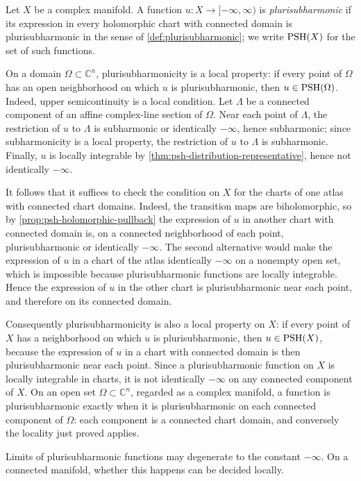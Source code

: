 Let $X$ be a complex manifold. A function $u\colon X\to[-\infty,\infty)$ is \emph{plurisubharmonic} if its expression in every holomorphic chart with connected domain is plurisubharmonic in the sense of \cref{def:plurisubharmonic}; we write $\mathrm{PSH}(X)$ for the set of such functions.

On a domain $\Omega\subset\mathbb C^n$, plurisubharmonicity is a local property: if every point of $\Omega$ has an open neighborhood on which $u$ is plurisubharmonic, then $u\in\mathrm{PSH}(\Omega)$. Indeed, upper semicontinuity is a local condition. Let $\Lambda$ be a connected component of an affine complex-line section of $\Omega$. Near each point of $\Lambda$, the restriction of $u$ to $\Lambda$ is subharmonic or identically $-\infty$, hence subharmonic; since subharmonicity is a local property, the restriction of $u$ to $\Lambda$ is subharmonic. Finally, $u$ is locally integrable by \cref{thm:psh-distribution-representative}, hence not identically $-\infty$.

It follows that it suffices to check the condition on $X$ for the charts of one atlas with connected chart domains. Indeed, the transition maps are biholomorphic, so by \cref{prop:psh-holomorphic-pullback} the expression of $u$ in another chart with connected domain is, on a connected neighborhood of each point, plurisubharmonic or identically $-\infty$. The second alternative would make the expression of $u$ in a chart of the atlas identically $-\infty$ on a nonempty open set, which is impossible because plurisubharmonic functions are locally integrable. Hence the expression of $u$ in the other chart is plurisubharmonic near each point, and therefore on its connected domain.

Consequently plurisubharmonicity is also a local property on $X$: if every point of $X$ has a neighborhood on which $u$ is plurisubharmonic, then $u\in\mathrm{PSH}(X)$, because the expression of $u$ in a chart with connected domain is then plurisubharmonic near each point. Since a plurisubharmonic function on $X$ is locally integrable in charts, it is not identically $-\infty$ on any connected component of $X$. On an open set $\Omega\subset\mathbb C^n$, regarded as a complex manifold, a function is plurisubharmonic exactly when it is plurisubharmonic on each connected component of $\Omega$: each component is a connected chart domain, and conversely the locality just proved applies.

Limits of plurisubharmonic functions may degenerate to the constant $-\infty$. On a connected manifold, whether this happens can be decided locally.

